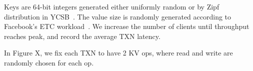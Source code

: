 Keys are 64-bit integers generated either uniformly random or by Zipf distribution in YCSB~\cite{cooper2010benchmarking}.
The value size is randomly generated according to Facebook's ETC workload~\cite{atikoglu2012workload}.
We increase the number of clients until throughput reaches peak, and record the average TXN latency.


In Figure X, we fix each TXN to have 2 KV ops, where read and write are randomly chosen for each op.


